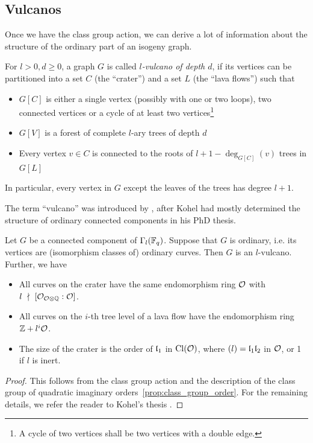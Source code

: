 \subsection{Vulcanos}
Once we have the class group action, we can derive a lot of information about the structure of the ordinary part of an isogeny graph.
\begin{definition}
    For $l > 0, d \geq 0$, a graph $G$ is called \emph{$l$-vulcano of depth $d$}, if its vertices can be partitioned into a set $C$ (the ``crater'') and a set $L$ (the ``lava flows'') such that
    \begin{itemize}
        \item $G[C]$ is either a single vertex (possibly with one or two loops), two connected vertices or a cycle of at least two vertices\footnote{A cycle of two vertices shall be two vertices with a double edge.}
        \item $G[V]$ is a forest of complete $l$-ary trees of depth $d$
        \item Every vertex $v \in C$ is connected to the roots of $l + 1 - \deg_{G[C]}(v)$ trees in $G[L]$
    \end{itemize}
    In particular, every vertex in $G$ except the leaves of the trees has degree $l + 1$.
\end{definition}
The term ``vulcano'' was introduced by \cite{isogeny_vulcano}, after Kohel had mostly determined the structure of ordinary connected components in his PhD thesis.
\begin{theorem}
    \label{prop:isogeny_vulcano}
    Let $G$ be a connected component of $\Gamma_l(\mathbb{F}_q)$.
    Suppose that $G$ is ordinary, i.e. its vertices are (isomorphism classes of) ordinary curves.
    Then $G$ is an $l$-vulcano.
    Further, we have
    \begin{itemize}
        \item All curves on the crater have the same endomorphism ring $\mathcal{O}$ with $l \ \nmid \  [\mathcal{O}_{\mathcal{O} \otimes \mathbb{Q}} : \mathcal{O}]$.
        \item All curves on the $i$-th tree level of a lava flow have the endomorphism ring $\mathbb{Z} + l^i\mathcal{O}$.
        \item The size of the crater is the order of $\mathfrak{l}_1$ in $\mathrm{Cl}(\mathcal{O})$, where $(l) = \mathfrak{l}_1\mathfrak{l}_2$ in $\mathcal{O}$, or 1 if $l$ is inert.
    \end{itemize} 
\end{theorem}
\begin{proof}
    This follows from the class group action and the description of the class group of quadratic imaginary orders~\ref{prop:class_group_order}.
    For the remaining details, we refer the reader to Kohel's thesis \cite[Prop.~23]{kohel}.
\end{proof}
